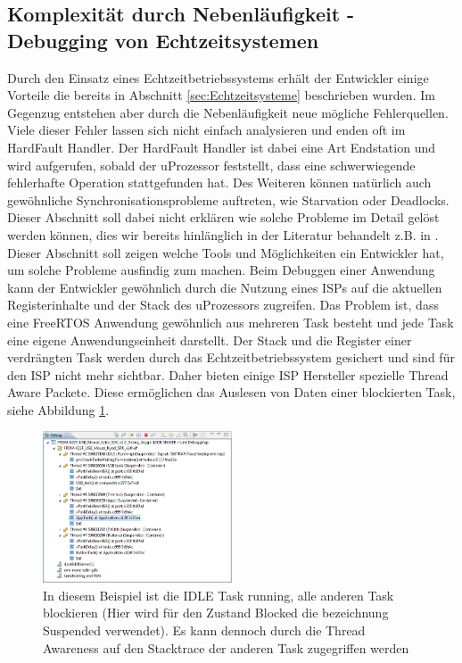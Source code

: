 \subsection{Komplexität durch Nebenläufigkeit - Debugging von Echtzeitsystemen}
\label{sec:Debugging von Echtzeitsystemen}
Durch den Einsatz eines Echtzeitbetriebssystems erhält der Entwickler einige Vorteile die bereits in Abschnitt \ref{sec:Echtzeitsysteme} beschrieben wurden. Im Gegenzug entstehen aber durch die Nebenläufigkeit neue mögliche Fehlerquellen. Viele dieser Fehler lassen sich nicht einfach analysieren und enden oft im HardFault Handler. Der HardFault Handler ist dabei eine Art Endstation und wird aufgerufen, sobald der uProzessor feststellt, dass eine schwerwiegende fehlerhafte Operation stattgefunden hat. Des Weiteren können na\-tür\-lich auch gewöhnliche Synchronisationsprobleme auftreten, wie Starvation oder Deadlocks. Dieser Abschnitt soll dabei nicht erklären wie solche Probleme im Detail gelöst werden können, dies wir bereits hinlänglich in der Literatur behandelt z.B. in \cite{9783827373427} \cite{9783864902222}. Dieser Abschnitt soll zeigen welche Tools und Möglichkeiten ein Entwickler hat, um solche Probleme ausfindig zum machen. Beim Debuggen einer Anwendung kann der Entwickler gewöhnlich durch die Nutzung eines ISPs auf die aktuellen Registerinhalte und der Stack des uProzessors zugreifen. Das Problem ist, dass eine FreeRTOS Anwendung gewöhnlich aus mehreren Task besteht und jede Task eine eigene Anwendungseinheit darstellt. Der Stack und die Register einer verdrängten Task werden durch das Echtzeitbetriebssystem gesichert und sind für den ISP nicht mehr sichtbar. Daher bieten einige ISP Hersteller spezielle Thread Aware Packete. Diese ermöglichen das Auslesen von Daten einer blockierten Task, siehe Abbildung \ref{fig:ThreadAware}.
\begin{figure}[hbt]
	\centering
		\includegraphics[width=0.5\textwidth]{Pictures/Segger/freertosThreadAwareness}
	\caption{In diesem Beispiel ist die IDLE Task running, alle anderen Task blockieren (Hier wird für den Zustand Blocked die bezeichnung Suspended verwendet). Es kann dennoch durch die Thread Awareness auf den Stacktrace der anderen Task zugegriffen werden }
	\label{fig:ThreadAware}
\end{figure}
